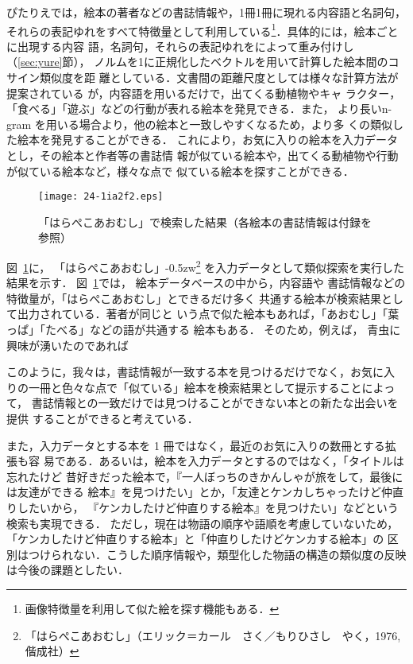 \documentclass[japanese]{jnlp_1.4}
\newcommand{\changedB}[1]{}
\renewcommand{\changedB}[1]{}
\newcommand{\tfidf}{}
\begin{document}
ぴたりえでは，絵本の著者などの書誌情報や，1冊1冊に現れる内容語と名詞句，
それらの表記ゆれをすべて特徴量として利用している\footnote{画像特徴量を利用して似た絵を探す機能もある．}．具体的には，絵本ごとに出現する内容
語，名詞句，それらの表記ゆれを\tfidf{}によって重み付けし（\ref{sec:yure}節），
ノルムを1に正規化したベクトルを用いて計算した絵本間のコサイン類似度を距
離としている．文書間の距離尺度としては様々な計算方法が提案されている
が\cite{Asahara:Kato:2015j}，内容語を用いるだけで，出てくる動植物やキャ
ラクター，「食べる」「遊ぶ」などの行動が表れる絵本を発見できる．また，
より長いn-gram を用いる場合より，他の絵本と一致しやすくなるため，より多
くの類似した絵本を発見することができる．
これにより，お気に入りの絵本を入力データとし，その絵本と作者等の書誌情
報が似ている絵本や，出てくる動植物や行動が似ている絵本など，様々な点で
似ている絵本を探すことができる．

\begin{figure}[b]
\begin{center}
\texttt{[image: 24-1ia2f2.eps]}
\end{center}
\caption{「はらぺこあおむし」で検索した結果（各絵本の書誌情報は付録を参照）}
\label{fig:ruiji}
\end{figure}


図~\ref{fig:ruiji}に，
「はらぺこあおむし」{\kern-0.5zw}\footnote{「はらぺこあおむし」（エリック＝カール　さく／もりひさし　やく，1976, 偕成社）}
を入力データとして類似探索を実行した結果を示す．
図~\ref{fig:ruiji}では，
絵本データベースの中から，内容語や
書誌情報などの特徴量が，「はらぺこあおむし」とできるだけ多く
共通する絵本が検索結果として出力されている．著者が同じと
いう点で似た絵本もあれば，「あおむし」「葉っぱ」「たべる」などの語が共通する
絵本もある．
そのため，例えば，
青虫に興味が湧いたのであれば\changedB{青虫の出てくる
他の絵本，色々な食べ物を食べるのが面白かったのであれば
色々な食べ物の出てくる他の絵本，といった選び方をすることもできる．}



このように，我々は，書誌情報が一致する本を見つけるだけでなく，お気に入
りの一冊と色々な点で「似ている」絵本を検索結果として提示することによって，
書誌情報との一致だけでは見つけることができない本との新たな出会いを提供
することができると考えている．

また，入力データとする本を 1 冊ではなく，最近のお気に入りの数冊とする拡張も容
易である．あるいは，絵本を入力データとするのではなく，「タイトルは忘れたけど
昔好きだった絵本で，『一人ぼっちのきかんしゃが旅をして，最後には友達ができる
絵本』を見つけたい」とか，「友達とケンカしちゃったけど仲直りしたいから，
『ケンカしたけど仲直りする絵本』を見つけたい」などという検索も実現できる．
ただし，現在は物語の順序や語順を考慮していないため，
「ケンカしたけど仲直りする絵本」と「仲直りしたけどケンカする絵本」の
区別はつけられない．こうした順序情報や，類型化した物語の構造の類似度の反映は今後の課題としたい．
\end{document}
